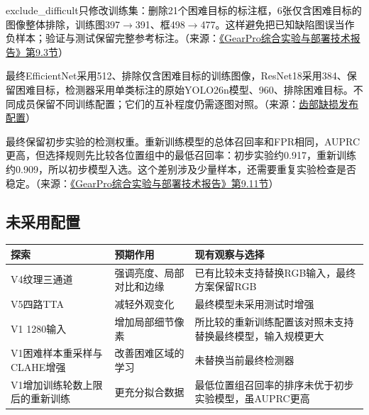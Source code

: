 exclude\_difficult只修改训练集：删除21个困难目标的标注框，6张仅含困难目标的图像整体排除，训练图397\ensuremath{\rightarrow}391、框498\ensuremath{\rightarrow}477。这样避免把已知缺陷图误当作负样本；验证与测试保留完整参考标注。（来源：\protect\href{run:../GearPro_综合技术报告_Markdown含配图/GearPro_综合实验与部署技术报告.md}{《GearPro综合实验与部署技术报告》第9.3节}）

最终EfficientNet采用512、排除仅含困难目标的训练图像，ResNet18采用384、保留困难目标，检测器采用单类标注的原始YOLO26n模型、960、排除困难目标。不同成员保留不同训练配置；它们的互补程度仍需逐图对照。（来源：\protect\hyperlink{source-2}{齿部缺损发布配置}）

最终保留初步实验的检测权重。重新训练模型的总体召回率和FPR相同，AUPRC更高，但选择规则先比较各位置组中的最低召回率：初步实验约0.917，重新训练约0.909，所以初步模型入选。这个差别涉及少量样本，还需要重复实验检查是否稳定。（来源：\protect\href{run:../GearPro_综合技术报告_Markdown含配图/GearPro_综合实验与部署技术报告.md}{《GearPro综合实验与部署技术报告》第9.11节}）

\FloatBarrier{}\subsection{未采用配置}

\par\medskip\noindent\begin{minipage}{\linewidth}\small{}
\begin{tabular}{@{}>{\raggedright\arraybackslash}p{0.240\dimexpr\linewidth-4\tabcolsep\relax}>{\raggedright\arraybackslash}p{0.340\dimexpr\linewidth-4\tabcolsep\relax}>{\raggedright\arraybackslash}p{0.420\dimexpr\linewidth-4\tabcolsep\relax}@{}}
\toprule
探索 & 预期作用 & 现有观察与选择 \\
\midrule
V4纹理三通道 & 强调亮度、局部对比和边缘 & 已有比较未支持替换RGB输入，最终方案保留RGB \\
V5四路TTA & 减轻外观变化 & 最终模型未采用测试时增强 \\
V1 1280输入 & 增加局部细节像素 & 所比较的重新训练配置该对照未支持替换最终模型，输入规模更大 \\
V1困难样本重采样与CLAHE增强 & 改善困难区域的学习 & 未替换当前最终检测器 \\
V1增加训练轮数上限后的重新训练 & 更充分拟合数据 & 最低位置组召回率的排序未优于初步实验模型，虽AUPRC更高 \\
\bottomrule\end{tabular}\end{minipage}\par\medskip


